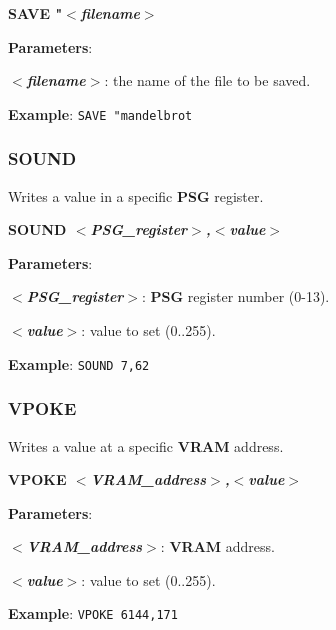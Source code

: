         \hspace{1.9cm}\textbf{SAVE "\textit{$<$filename$>$}}

        \textbf{Parameters}:

        \hspace{1cm}\textbf{\textit{$<$filename$>$}}: the name of the file to be
        saved.

        \textbf{Example}: \texttt{SAVE "mandelbrot}


        \subsubsection{{SOUND}}
        Writes a value in a specific \textbf{PSG} register.

        \hspace{1.9cm}\textbf{SOUND \textit{$<$PSG\_register$>$,$<$value$>$}}

        \textbf{Parameters}:

        \hspace{1cm}\textbf{\textit{$<$PSG\_register$>$}}: \textbf{PSG} register
        number (0-13).

        \hspace{1cm}\textbf{\textit{$<$value$>$}}: value to set (0..255).

        \textbf{Example}: \texttt{SOUND 7,62}

        \subsubsection{{VPOKE}}
        Writes a value at a specific \textbf{VRAM} address.

        \hspace{1.9cm}\textbf{VPOKE \textit{$<$VRAM\_address$>$,$<$value$>$}}

        \textbf{Parameters}:

        \hspace{1cm}\textbf{\textit{$<$VRAM\_address$>$}}: \textbf{VRAM} address.

        \hspace{1cm}\textbf{\textit{$<$value$>$}}: value to set (0..255).

        \textbf{Example}: \texttt{VPOKE 6144,171}

